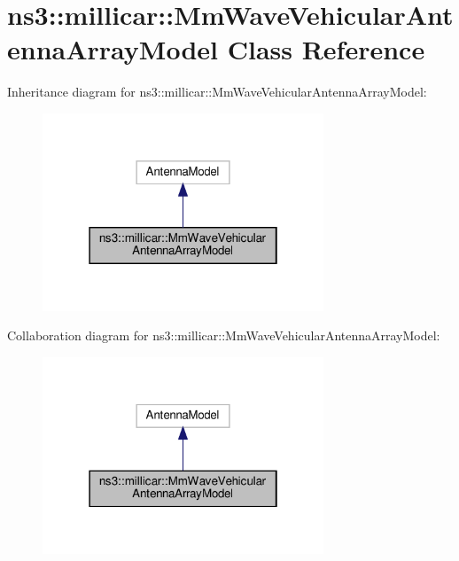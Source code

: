 \hypertarget{classns3_1_1millicar_1_1MmWaveVehicularAntennaArrayModel}{}\section{ns3\+:\+:millicar\+:\+:Mm\+Wave\+Vehicular\+Antenna\+Array\+Model Class Reference}
\label{classns3_1_1millicar_1_1MmWaveVehicularAntennaArrayModel}


Inheritance diagram for ns3\+:\+:millicar\+:\+:Mm\+Wave\+Vehicular\+Antenna\+Array\+Model\+:
\nopagebreak
\begin{figure}[H]
\begin{center}
\leavevmode
\includegraphics[width=238pt]{classns3_1_1millicar_1_1MmWaveVehicularAntennaArrayModel__inherit__graph}
\end{center}
\end{figure}


Collaboration diagram for ns3\+:\+:millicar\+:\+:Mm\+Wave\+Vehicular\+Antenna\+Array\+Model\+:
\nopagebreak
\begin{figure}[H]
\begin{center}
\leavevmode
\includegraphics[width=238pt]{classns3_1_1millicar_1_1MmWaveVehicularAntennaArrayModel__coll__graph}
\end{center}
\end{figure}
